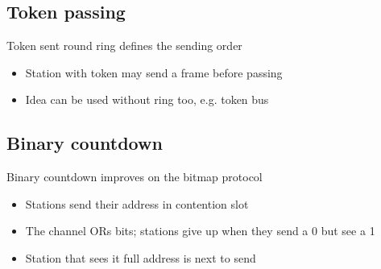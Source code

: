 \documentclass{article}[18pt]
\begin{document}
\subsection{Token passing}
Token sent round ring defines the sending order
\begin{itemize}
	\item Station with token may send a frame before passing
	\item Idea can be used without ring too, e.g. token bus
\end{itemize}
\subsection{Binary countdown}
Binary countdown improves on the bitmap protocol
\begin{itemize}
	\item Stations send their address in contention slot
	\item The channel ORs bits; stations give up when they send a 0 but see a 1
	\item Station that sees it full address is next to send
\end{itemize}
\end{document}
